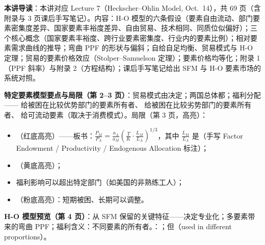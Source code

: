 
\textbf{本讲导读}：本讲对应 Lecture 7（Heckscher--Ohlin Model, Oct.\ 14），共 69 页（含附录与 3 页课后手写笔记）。内容：H-O 模型的六条假设（要素自由流动、部门要素密集度差异、国家要素丰裕度差异、自由贸易、技术相同、同质位似偏好）；三个核心概念（国家要素丰裕度、跨行业要素密集度、行业内的要素比例）；相对要素需求曲线的推导；弯曲 PPF 的形状与偏斜；自给自足均衡、贸易模式与 H-O 定理；贸易的要素价格效应（Stolper--Samuelson 定理）；要素价格均等化；附录 1（PPF 斜率）与附录 2（方程结构）；课后手写笔记给出 SFM 与 H-O 要素市场的系统对照。


\textbf{特定要素模型要点与局限（第 2--3 页）}：贸易模式由决定；两国总体都；福利分配—— 给被困在比较优势部门的要素所有者、 给被困在比较劣势部门的要素所有者、 给可流动要素（取决于消费模式）。局限（第 3 页，高亮）：
\begin{itemize}
  \item {}（红底高亮）——板书：$\frac{P_M}{P_A} = \frac{a_A}{a_M}\left( \frac{T}{K} \cdot \frac{L_M}{L_A} \right)^{1/3}$，其中 $\frac{L_M}{L_A}$ 是（手写 Factor Endowment / Productivity / Endogenous Allocation 标注）；
  \item {}（黄底高亮）；
  \item 福利影响可以超出特定部门（如美国的非熟练工人）；
  \item {}（粉底高亮）：短期被困、长期可以调整。
\end{itemize}

\textbf{H-O 模型预览（第 4 页）}：从 SFM 保留的关键特征——决定专业化；多要素带来的弯曲 PPF；福利含义：不同要素的所有者。：；但（used in different proportions）。



